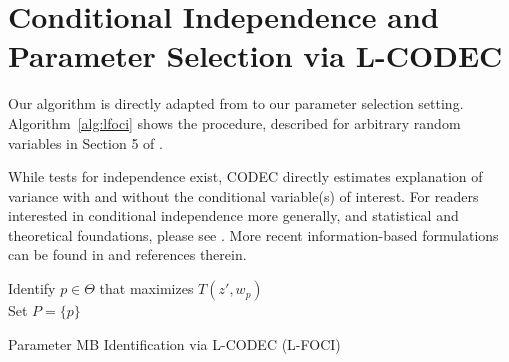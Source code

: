 \section{Conditional Independence and Parameter Selection via L-CODEC}\label{app:5:ci}
Our algorithm is directly adapted from \cite{codec} to our parameter selection setting. Algorithm~\ref{alg:lfoci} shows the procedure, described for arbitrary random variables in Section 5 of \cite{codec}. 

While tests for independence exist, CODEC directly estimates explanation of variance with and without the conditional variable(s) of interest. For readers interested in conditional independence more generally, and statistical and theoretical foundations, please see \cite{spirtes2000causation, dawid1979conditional}. More recent information-based formulations can be found in \cite{bullseye} and references therein.

\begin{algorithm}
\SetAlgoLined
{}
Identify $p \in \Theta$ that maximizes $T(z',w_p)$ \\
Set $P = \{p\}$ \\
 \caption{\label{alg:lfoci} Parameter MB Identification via L-CODEC (L-FOCI)}
\end{algorithm}